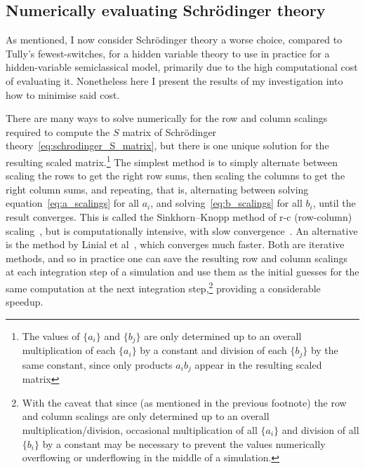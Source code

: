 \subsection{Numerically evaluating Schr\"odinger theory}\label{sec:schrodinger_theory_numerics}

As mentioned, I now consider Schr\"odinger theory a worse choice, compared to Tully's fewest-switches, for a hidden variable theory to use in practice for a hidden-variable semiclassical model, primarily due to the high computational cost of evaluating it. Nonetheless here I present the results of my investigation into how to minimise said cost.

There are many ways to solve numerically for the row and column scalings required to compute the $S$ matrix of Schr\"odinger theory~\eqref{eq:schrodinger_S_matrix}, but there is one unique solution for the resulting scaled matrix.\footnote{The values of $\{a_i\}$ and $\{b_j\}$ are only determined up to an overall multiplication of each $\{a_i\}$ by a constant and division of each $\{b_j\}$ by the same constant, since only products $a_i b_j$ appear in the resulting scaled matrix} The simplest method is to simply alternate between scaling the rows to get the right row sums, then scaling the columns to get the right column sums, and repeating, that is, alternating between solving equation~\eqref{eq:a_scalings} for all $a_i$, and solving~\eqref{eq:b_scalings} for all $b_i$, until the result converges. This is called the Sinkhorn--Knopp method of r-c (row-column) scaling~\cite{knight_sinkhornknopp_2008}, but is computationally intensive, with slow convergence~\cite{Linial2000}. An alternative is the method by Linial et al~\cite{Linial2000}, which converges much faster. Both are iterative methods, and so in practice one can save the resulting row and column scalings at each integration step of a simulation and use them as the initial guesses for the same computation at the next integration step,\footnote{With the caveat that since (as mentioned in the previous footnote) the row and column scalings are only determined up to an overall multiplication/division, occasional multiplication of all $\{a_i\}$ and division of all $\{b_i\}$ by a constant may be necessary to prevent the values numerically overflowing or underflowing in the middle of a simulation.} providing a considerable speedup.

